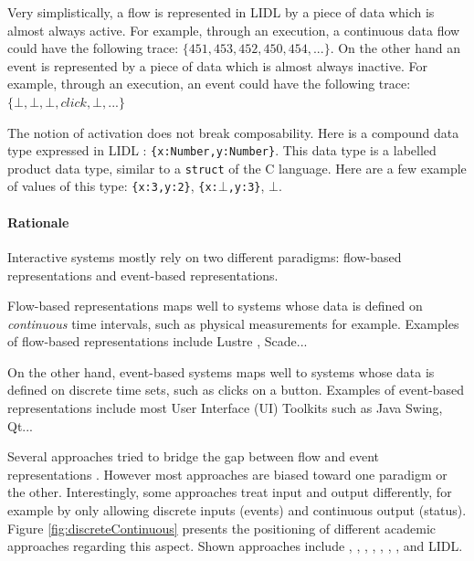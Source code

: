 \documentclass[10pt]{sigplanconf}
\begin{document}
Very simplistically, a flow is represented in LIDL by a piece of data which is almost always active. For example, through an execution, a continuous data flow could have the following trace: $\{ 451, 453, 452, 450, 454, ...\}$. On the other hand an event is represented by a piece of data which is almost always inactive. For example, through an execution, an event could have the following trace: $\{ \bot, \bot, \bot, click, \bot, ...  \}$

The notion of activation does not break composability. Here is a compound data type expressed in LIDL : \texttt{\{x:Number,y:Number\}}. This data type is a labelled product data type, similar to a \texttt{struct} of the C language. Here are a few example of values of this type: \texttt{\{x:3,y:2\}}, \texttt{\{x:$\bot$,y:3\}}, \texttt{$\bot$}.





\paragraph{Rationale}

Interactive systems mostly rely on two different paradigms: flow-based representations and event-based representations. 

Flow-based representations maps well to systems whose data is defined on \emph{continuous} time intervals, such as physical measurements for example. Examples of flow-based representations include Lustre \cite{halbwachs91}, Scade... 

On the other hand, event-based systems maps well to systems whose data is defined on discrete time sets, such as clicks on a button. Examples of event-based representations include most User Interface (UI) Toolkits such as Java Swing, Qt...

Several approaches tried to bridge the gap between flow and event representations \cite{abowd22integrating}. However most approaches are biased toward one paradigm or the other. Interestingly, some approaches treat input and output differently, for example by only allowing discrete inputs (events) and continuous output (status). Figure \ref{fig:discreteContinuous} presents the positioning of different academic approaches regarding this aspect. Shown approaches include \cite{halbwachs91}, \cite{dix1991formal}, \cite{Dix85}, \cite{Duke-Harrison93a}, \cite{Harel97}, \cite{actors86}, \cite{Paterno92}, \cite{Navarre:2009:IMU:1614390.1614393} and LIDL.
\end{document}
